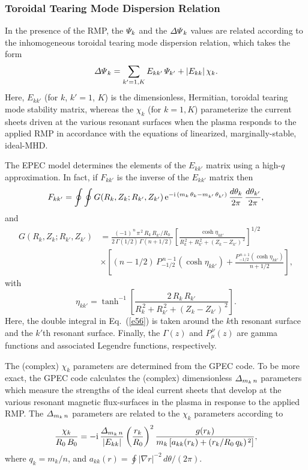 \documentclass[12pt,prb,aps]{revtex4-1}
\begin{document}
\subsubsection{Toroidal Tearing Mode Dispersion Relation}\label{tear}
In the presence of the RMP, the ${\mit\Psi}_k$ and the ${\mit\Delta\Psi}_k$ values are related according to the inhomogeneous 
toroidal tearing mode dispersion relation, which takes the form
\begin{equation}\label{dispersion}
{\mit\Delta\Psi}_k = \sum_{k'=1,K} E_{kk'}\,{\mit\Psi}_{k'} + |E_{kk}|\,\chi_k.
\end{equation}
Here, $E_{kk'}$  (for $k$, $k'= 1$, $K$) is the dimensionless, Hermitian, toroidal tearing mode stability matrix, whereas the $\chi_k$ (for $k=1,K$) parameterize the current sheets driven at the various
resonant surfaces when the plasma responds  to the applied RMP in accordance with the equations of linearized, marginally-stable, ideal-MHD. 

The EPEC model determines the elements of the $E_{kk'}$ matrix using a high-$q$ approximation. In fact, if $F_{kk'}$ is the inverse of the $E_{kk'}$ matrix then
\begin{equation}\label{e56}
F_{kk'} = \oint\oint 
G(R_k,Z_k;R_{k'},Z_{k'})\,{\rm e}^{-{\rm i}\,(m_k\,\theta_k-m_{k'}\,\theta_{k'})}\,\frac{d\theta_k}{2\pi}\,\frac{d\theta_{k'}}{2\pi},
\end{equation}
and
\begin{align}
 G(R_k,Z_k;R_{k'},Z_{k'})&= \frac{(-1)^{\,n}\,\pi^{\,2}\,R_k\,R_{k'}/R_0}{2\,{\Gamma}(1/2)\,{\Gamma}(n+1/2)}
\left[\frac{\cosh\eta_{kk'}}{R_k^{\,2}+R_{k'}^{\,2}+(Z_k-Z_{k'})^{\,2}}\right]^{1/2}\nonumber\\[0.5ex]
&\times\left[(n-1/2)\,P_{-1/2}^{\,n-1}(\cosh\eta_{kk'})+
\frac{P_{-1/2}^{\,n+1}(\cosh\eta_{kk'})}{n+1/2}\right],
\end{align}
with
\begin{equation}
\eta_{kk'} = \tanh^{-1}\left[\frac{2\,R_k\,R_{k'}}{R_k^{\,2}+R_{k'}^{\,2}+(Z_k-Z_{k'})^{\,2}}\right].
\end{equation}
Here, the double integral in Eq.~(\ref{e56}) is taken around the
$k$th resonant surface and the $k'$th resonant surface. Finally, the ${\Gamma}(z)$ and $P_\mu^{\,\nu}(z)$ are gamma functions and associated Legendre functions, respectively.

The (complex) $\chi_k$ parameters are determined from the GPEC code.\cite{gpec}
To be more exact, the GPEC code calculates the (complex) dimensionless ${\mit\Delta}_{m_k\,n}$ parameters which measure the strengths of the ideal current sheets that develop
at the various resonant magnetic flux-surfaces in the plasma in response to the applied RMP.  The ${\mit\Delta}_{m_k\,n}$ parameters are related to the $\chi_k$ parameters according to
\begin{equation}\label{a8}
\frac{\chi_k}{R_0\,B_0} = -{\rm i} \,\frac{{\mit\Delta}_{m_k\,n}}{|E_{kk}|}\left(\frac{r_k}{R_0}\right)^2
\frac{g(r_k)}{m_k\,[a_{kk}(r_k)+ (r_k/R_0\,q_k)^{\,2}]},
\end{equation}
where $q_k= m_k/n$, and $a_{kk}(r) = \oint |\nabla r|^{-2}\,d\theta/(2\pi)$. 
\end{document}

